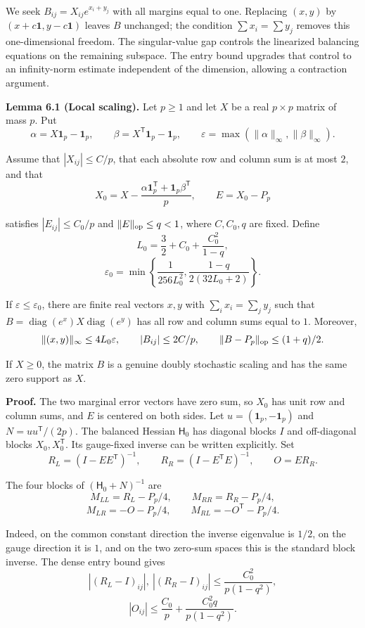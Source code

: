 \documentclass[11pt,a4paper]{article}
\makeatletter
\newcommand{\paperstatement}[3]{\par\addvspace{6pt}\Needspace{4\baselineskip}\phantomsection\def\@currentlabel{#2}\label{#3}\noindent\textbf{#1}\enspace}
\makeatother
\begin{document}
We seek \(B_{ij}=X_{ij}e^{x_i+y_j}\) with all margins equal to one. Replacing \((x,y)\) by \((x+c\mathbf1,y-c\mathbf1)\) leaves \(B\) unchanged; the condition \(\sum x_i=\sum y_j\) removes this one-dimensional freedom. The singular-value gap controls the linearized balancing equations on the remaining subspace. The entry bound upgrades that control to an infinity-norm estimate independent of the dimension, allowing a contraction argument.

\paperstatement{Lemma 6.1 (Local scaling).}{6.1}{thm-6.1} Let \(p\ge1\) and let \(X\) be a real \(p\times p\) matrix of mass \(p\). Put
\[\alpha=X\mathbf 1_p-\mathbf 1_p,\qquad \beta=X^{\mathsf T}\mathbf 1_p-\mathbf 1_p,\qquad \varepsilon=\max(\|\alpha\|_\infty,\|\beta\|_\infty).\]

Assume that \(|X_{ij}|\le C/p\), that each absolute row and column sum is at most \(2\), and that
\[X_0=X-\frac{\alpha\mathbf 1_p^{\mathsf T}+\mathbf 1_p\beta^{\mathsf T}}p,\qquad E=X_0-P_p\]

satisfies \(|E_{ij}|\le C_0/p\) and \(\|E\|_{\rm op}\le q<1\), where \(C,C_0,q\) are fixed. Define
\[L_0=\frac32+C_0+\frac{C_0^2}{1-q},\]
\nopagebreak[3]\[\varepsilon_0=\min\left\{\frac1{256L_0^2},\frac{1-q}{2(32L_0+2)}\right\}.\]

If \(\varepsilon\le\varepsilon_0\), there are finite real vectors \(x,y\) with \(\sum_i x_i=\sum_j y_j\) such that \(B=\operatorname{diag}(e^x)X\operatorname{diag}(e^y)\) has all row and column sums equal to \(1\). Moreover,
\[\|(x,y)\|_\infty\le4L_0\varepsilon,\qquad |B_{ij}|\le2C/p,\qquad \|B-P_p\|_{\rm op}\le(1+q)/2.\]

If \(X\ge0\), the matrix \(B\) is a genuine doubly stochastic scaling and has the same zero support as \(X\).

\textbf{Proof.} The two marginal error vectors have zero sum, so \(X_0\) has unit row and column sums, and \(E\) is centered on both sides. Let \(u=(\mathbf 1_p,-\mathbf 1_p)\) and \(N=uu^{\mathsf T}/(2p)\). The balanced Hessian \(\mathsf H_0\) has diagonal blocks \(I\) and off-diagonal blocks \(X_0,X_0^{\mathsf T}\). Its gauge-fixed inverse can be written explicitly. Set
\[R_L=(I-EE^{\mathsf T})^{-1},\qquad R_R=(I-E^{\mathsf T}E)^{-1},\qquad O=ER_R.\]

The four blocks of \((\mathsf H_0+N)^{-1}\) are
\[M_{LL}=R_L-P_p/4,\qquad M_{RR}=R_R-P_p/4,\]
\nopagebreak[3]\[M_{LR}=-O-P_p/4,\qquad M_{RL}=-O^{\mathsf T}-P_p/4.\]

Indeed, on the common constant direction the inverse eigenvalue is \(1/2\), on the gauge direction it is \(1\), and on the two zero-sum spaces this is the standard block inverse. The dense entry bound gives
\[|(R_L-I)_{ij}|,\ |(R_R-I)_{ij}|\le\frac{C_0^2}{p(1-q^2)},\]
\nopagebreak[3]\[|O_{ij}|\le\frac{C_0}{p}+\frac{C_0^2q}{p(1-q^2)}.\]
\end{document}
